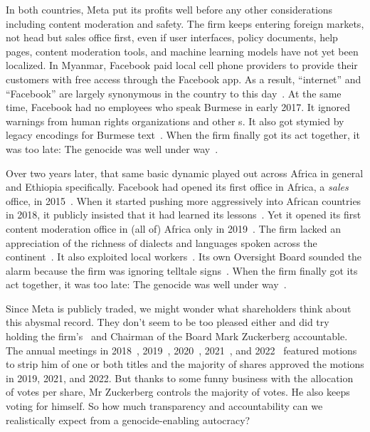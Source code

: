 In both countries, Meta put its profits well before any other considerations
including content moderation and safety. The firm keeps entering foreign
markets, not head but sales office first, even if user interfaces, policy
documents, help pages, content moderation tools, and machine learning models
have not yet been localized. In Myanmar, Facebook paid local cell phone
providers to provide their customers with free access through the Facebook app.
As a result, ``internet'' and ``Facebook'' are largely synonymous in the country
to this day~\cite{Strom2016}. At the same time, Facebook had no employees who
speak Burmese in early 2017. It ignored warnings from human rights organizations
and other \NGO{}s. It also got stymied by legacy encodings for Burmese
text~\cite{LaGrowPruzan2019,Wade2022}. When the firm finally got its act
together, it was too late: The genocide was well under
way~\cite{McLaughlin2018,MilkoOrtutay2022,Mozur2018,Ortutay2022}.

Over two years later, that same basic dynamic played out across Africa in
general and Ethiopia specifically. Facebook had opened its first office in
Africa, a \emph{sales} office, in 2015~\cite{Wagner2015}. When it started
pushing more aggressively into African countries in 2018, it publicly insisted
that it had learned its lessons~\cite{Tiku2018}. Yet it opened its first content
moderation office in (all of) Africa only in 2019~\cite{Agutu2019}. The firm
lacked an appreciation of the richness of dialects and languages spoken across
the continent~\cite{FickDave2019,JacksonTownsendea2022,Madung2021}. It also
exploited local workers~\cite{AlSibai2022,Perrigo2022,Perrigo2023}. Its own
Oversight Board sounded the alarm because the firm was ignoring telltale
signs~\cite{Faife2021}. When the firm finally got its act together, it was too
late: The genocide was well under
way~\cite{Allen2022,Gilbert2020,GlobalWitness2022,Ilori2020,Malik2022,ElliottChristopherea2021,ZelalemGuest2021,RobinsEarly2021}.

Since Meta is publicly traded, we might wonder what shareholders think about
this abysmal record. They don't seem to be too pleased either and did try
holding the firm's \CEO\ and Chairman of the Board Mark Zuckerberg accountable.
The annual meetings in 2018~\cite{Butler2018}, 2019~\cite{Sumagaysay2019},
2020~\cite{McRitchie2020}, 2021~\cite{Nix2021}, and 2022~\cite{WatersAgnew2022}
featured motions to strip him of one or both titles and the majority of shares
approved the motions in 2019, 2021, and 2022. But thanks to some funny business
with the allocation of votes per share, Mr Zuckerberg controls the majority of
votes. He also keeps voting for himself. So how much transparency and
accountability can we realistically expect from a genocide-enabling autocracy?
